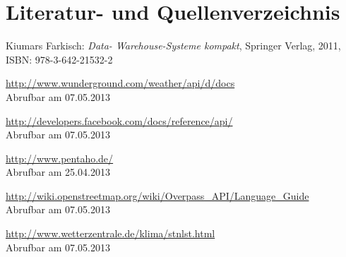 \documentclass[a4paper,12pt]{scrartcl}
\begin{document}

\clearpage
\section{Literatur- und Quellenverzeichnis}

\renewcommand\refname{Literaturverzeichnis}
\begin{thebibliography}{999}

Kiumars Farkisch:  {\sl Data- Warehouse-Systeme kompakt}, Springer Verlag, 2011,
\\ISBN:  978-3-642-21532-2

\end{thebibliography}

\renewcommand\refname{Quellenverzeichnis}
\begin{thebibliography}{999}

\url{http://www.wunderground.com/weather/api/d/docs}
\\Abrufbar am 07.05.2013


\url{http://developers.facebook.com/docs/reference/api/}
\\Abrufbar am 07.05.2013


\url{http://www.pentaho.de/}
\\Abrufbar am 25.04.2013


\url{http://wiki.openstreetmap.org/wiki/Overpass_API/Language_Guide}
\\Abrufbar am 07.05.2013


\url{http://www.wetterzentrale.de/klima/stnlst.html}
\\Abrufbar am 07.05.2013


\end{thebibliography}

\clearpage



\end{document}
